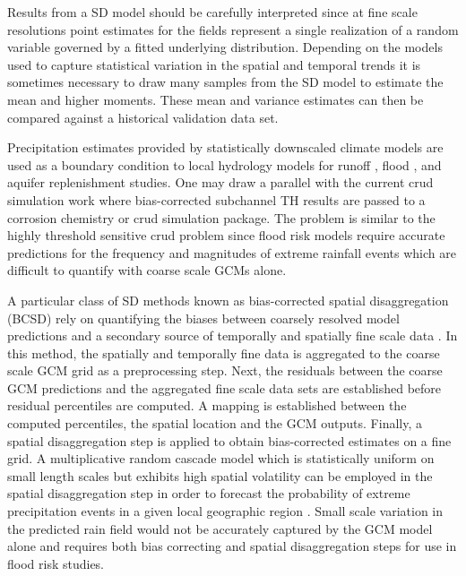 Results from a SD model should be carefully interpreted since at fine scale resolutions point estimates for the fields represent a single realization of a random variable governed by a fitted underlying distribution.  Depending on the models used to capture statistical variation in the spatial and temporal trends it is sometimes necessary to draw many samples from the SD model to estimate the mean and higher moments.  These mean and variance estimates can then be compared against a historical validation data set.

Precipitation estimates provided by statistically downscaled climate models are used as a boundary condition to local hydrology models for runoff \cite{wood2002}, flood \cite{hess2007}, and aquifer replenishment studies.  One may draw a parallel with the current crud simulation work where bias-corrected subchannel TH results are passed to a corrosion chemistry or crud simulation package. The problem is similar to the highly threshold sensitive crud problem since flood risk models require accurate predictions for the frequency and magnitudes of extreme rainfall events which are difficult to quantify with coarse scale GCMs alone.

A particular class of SD methods known as bias-corrected spatial disaggregation (BCSD) rely on quantifying the biases between coarsely resolved model predictions and a secondary source of temporally and spatially fine scale data \cite{wood2002}.  In this method, the spatially and temporally fine data is aggregated to the coarse scale GCM grid as a preprocessing step.  Next, the residuals between the coarse GCM predictions and the aggregated fine scale data sets are established before residual percentiles are computed.  A mapping is established between the computed percentiles, the spatial location and the GCM outputs.  Finally, a spatial disaggregation step is applied to obtain bias-corrected estimates on a fine grid.  A multiplicative random cascade model which is statistically uniform on small length scales but exhibits high spatial volatility can be employed in the spatial disaggregation step in order to forecast the probability of extreme precipitation events in a given local geographic region \cite{hess2007}.  Small scale variation in the predicted rain field would not be accurately captured by the GCM model alone and requires both bias correcting and spatial disaggregation steps for use in flood risk studies. 

